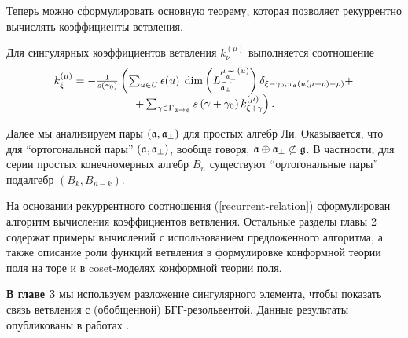 \documentclass[14pt,autoref,href,facsimile
]{disser}
\begin{document}
Теперь можно сформулировать основную теорему, которая позволяет рекуррентно вычислять коэффициенты ветвления.
\vspace{-0.5cm}
\begin{theorem}
  Для сингулярных коэффициентов ветвления $k^{(\mu)}_{\nu}$ выполняется соотношение
  \begin{equation}
    \label{recurrent-relation}
    \begin{array}{c}
      k_{\xi }^{\left( \mu \right) }=-\frac{1}{s\left( \gamma _{0}\right) }\left(
        \sum_{u\in U} \epsilon(u)\;
        \dim \left( L_{\widetilde{\mathfrak{a}_{\perp }}}^{\mu
        _{\widetilde{\mathfrak{a}_{\perp }}}\left( u\right) }\right)
        \delta_{\xi-\gamma_0,\pi_{\mathfrak{a}}(u(\mu+\rho)-\rho)}+ \right.\\
      \left.
        +\sum_{\gamma \in
          \Gamma _{\mathfrak{a} \rightarrow \mathfrak{g}}}s\left( \gamma +\gamma _{0}\right) k_{\xi
          +\gamma }^{\left( \mu \right) }\right).
    \end{array}
  \end{equation}
\end{theorem}
Далее мы анализируем пары $(\mathfrak{a},\mathfrak{a}_{\perp})$ для простых алгебр Ли. Оказывается, что для ``ортогональной пары'' $(\mathfrak{a},\mathfrak{a}_{\perp})$, вообще говоря, $\mathfrak{a}\oplus\mathfrak{a}_{\perp}\not\subset\mathfrak{g} $. В частности, для серии простых конечномерных алгебр $B_n$ существуют ``ортогональные пары'' подалгебр $(B_k,B_{n-k})$.

На основании рекуррентного соотношения (\ref{recurrent-relation}) сформулирован алгоритм вычисления коэффициентов ветвления. Остальные разделы главы 2 содержат примеры вычислений с использованием предложенного алгоритма, а также описание роли функций ветвления в формулировке конформной теории поля на торе и в coset-моделях конформной теории поля. 

\textbf{В главе 3} мы используем  разложение сингулярного элемента, чтобы показать связь ветвления с (обобщенной) БГГ-резольвентой.  Данные результаты опубликованы в работах .
\end{document}
